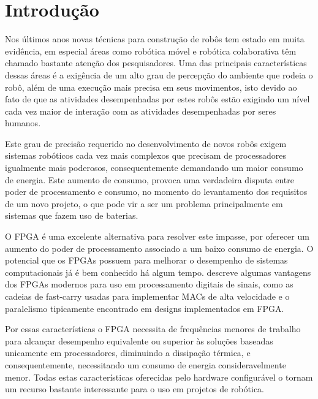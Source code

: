 \chapter{Introdução}\label{cap:intro}


Nos últimos anos novas técnicas para construção de robôs tem estado em muita evidência, em especial áreas como robótica móvel e robótica colaborativa têm chamado bastante atenção dos pesquisadores. Uma das principais características dessas áreas é a exigência de um alto grau de percepção do ambiente que rodeia o robô, além de uma execução mais precisa em seus movimentos, isto devido ao fato de que as atividades desempenhadas por estes robôs estão exigindo um nível cada vez maior de interação com as atividades desempenhadas por seres humanos.

Este grau de precisão requerido no desenvolvimento de novos robôs exigem sistemas robóticos cada vez mais complexos que precisam de processadores igualmente mais poderosos, consequentemente demandando um maior consumo de energia. Este aumento de consumo, provoca uma verdadeira disputa entre poder de processamento e consumo, no momento do levantamento dos requisitos de um novo projeto, o que pode vir a ser um problema principalmente em sistemas que fazem uso de baterias. 

O FPGA é uma excelente alternativa para resolver este impasse, por oferecer um aumento do poder de processamento associado a um baixo consumo de energia. O potencial que os FPGAs possuem para melhorar o desempenho de sistemas computacionais já é bem conhecido há algum tempo.  descreve algumas vantagens dos FPGAs modernos para uso em processamento digitais de sinais, como as cadeias de fast-carry usadas para implementar MACs de alta velocidade e o paralelismo tipicamente encontrado em designs implementados em FPGA\@. 

Por essas características o FPGA necessita de frequências menores de trabalho para alcançar desempenho equivalente ou superior às soluções baseadas unicamente em processadores, diminuindo a dissipação térmica, e consequentemente, necessitando um consumo de energia consideravelmente menor. Todas estas características oferecidas pelo hardware configurável o tornam um recurso bastante interessante para o uso em projetos de robótica.

